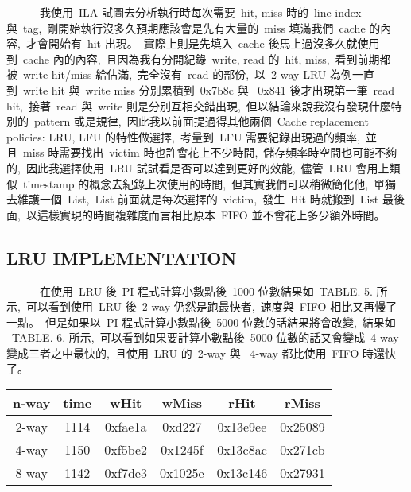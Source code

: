 \documentclass{article}
\begin{document}
\begin{CJK*}{UTF8}{bsmi}
\begin{multicols}{2}
\begin{flushleft}
    \ \ \ \ \ \ 我使用\ ILA 試圖去分析執行時每次需要\ hit, miss 時的\ line index 與\ tag,\
    剛開始執行沒多久預期應該會是先有大量的\ miss 填滿我們\ cache 的內容,\
    才會開始有\ hit 出現。\
    實際上則是先填入\ cache 後馬上過沒多久就使用到\ cache 內的內容,\
    且因為我有分開紀錄\ write, read 的\ hit, miss,\
    看到前期都被\ write hit/miss 給佔滿,\
    完全沒有\ read 的部份,\
    以\ 2-way LRU 為例一直到\ write hit 與\ write miss 分別累積到\ 0x7b8c 與 \ 0x841 後才出現第一筆\ read hit,\
    接著\ read 與\ write 則是分別互相交錯出現,\
    但以結論來說我沒有發現什麼特別的\ pattern 或是規律,\
    因此我以前面提過得其他兩個\ Cache replacement policies: LRU, LFU 的特性做選擇,\
    考量到\ LFU 需要紀錄出現過的頻率,\
    並且\ miss 時需要找出\ victim 時也許會花上不少時間,\
    儲存頻率時空間也可能不夠的,\
    因此我選擇使用\ LRU 試試看是否可以達到更好的效能,\
    儘管\ LRU 會用上類似\ timestamp 的概念去紀錄上次使用的時間,\
    但其實我們可以稍微簡化他,\
    單獨去維護一個\ List,\
    List 前面就是每次選擇的\ victim,\
    發生\ Hit 時就搬到\ List 最後面,\
    以這樣實現的時間複雜度而言相比原本\ FIFO 並不會花上多少額外時間。
\end{flushleft}

\begin{center}
    \section*{LRU IMPLEMENTATION}
\end{center}

\begin{flushleft}
    \ \ \ \ \ \ 在使用\ LRU 後\ PI 程式計算小數點後\ 1000 位數結果如\ TABLE. 5. 所示,\
    可以看到使用\ LRU 後\ 2-way 仍然是跑最快者,\
    速度與\ FIFO 相比又再慢了一點。\
    但是如果以\ PI 程式計算小數點後\ 5000 位數的話結果將會改變,\
    結果如 \ TABLE. 6. 所示,\
    可以看到如果要計算小數點後\ 5000 位數的話又會變成\ 4-way 變成三者之中最快的,\
    且使用\ LRU 的\ 2-way 與 \ 4-way 都比使用\ FIFO 時還快了。
\end{flushleft}
    
\begin{center}
    \begin{tabular}{||c c c c c c ||} 
        \hline
        n-way & time & wHit & wMiss & rHit & rMiss \\ [1.0ex] 
        \hline\hline
        2-way & 1114 & 0xfae1a & 0xd227 & 0x13e9ee & 0x25089  \\ 
        \hline
        4-way & 1150 & 0xf5be2 & 0x1245f & 0x13c8ac & 0x271cb  \\ 
        \hline
        8-way & 1142 & 0xf7de3 & 0x1025e & 0x13c146 & 0x27931 \\
        \hline
    \end{tabular}
\end{center}


\end{multicols}
\end{CJK*}
\end{document}
